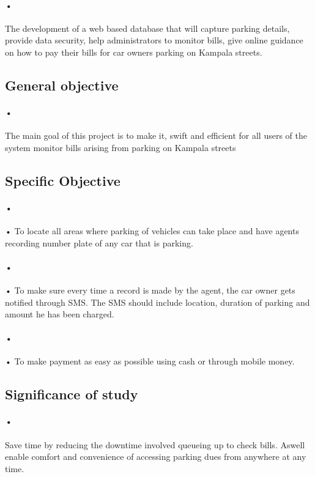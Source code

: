 \documentclass[12pt]{article}
\begin{document}
\paragraph{•}
The development of a web based database that will capture parking details, provide data security, help administrators to monitor bills, give online guidance on how to pay their bills for car owners parking on Kampala streets.

\subsection{General objective}
\paragraph{•}
The main goal of this project is to make it, swift and efficient for all users of the system monitor bills arising from parking on Kampala streets

 
\subsection{Specific Objective}
\paragraph{•}
•	To locate all areas where parking of vehicles can take place and have agents recording number plate of any car that is parking.\\
\paragraph{•}
•	To make sure every time a record is made by the agent, the car owner gets notified through SMS. The SMS should include location, duration of parking and amount he has been charged.\\
\paragraph{•}
•	To make payment as easy as possible using cash or through mobile money.

\subsection{Significance of study}
\paragraph{•}
 Save time by reducing the downtime involved queueing up to check bills. Aswell enable comfort and convenience of accessing parking dues from anywhere at any time.
\end{document}
